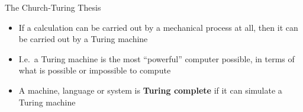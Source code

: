 \begin{frame}{The Church-Turing Thesis}
    \begin{itemize}
        \pause\item If a calculation can be carried out by a mechanical process at all,
            then it can be carried out by a Turing machine
        \pause\item I.e.\ a Turing machine is the most ``powerful'' computer possible,
            in terms of what is possible or impossible to compute
        \pause\item A machine, language or system is \textbf{Turing complete} if it can simulate a Turing machine
    \end{itemize}
\end{frame}

